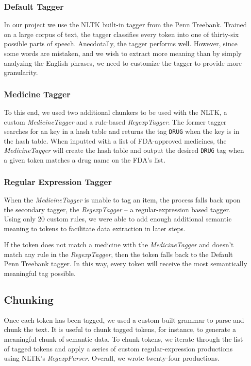 \documentclass{acm_proc_article-sp}
\begin{document}
\subsubsection{Default Tagger}
In our project we use the NLTK built-in tagger from the Penn Treebank\cite{treebank}. Trained on a
large corpus of text, the tagger classifies every token into one of thirty-six possible parts of speech. 
Anecdotally, the tagger performs well. However, since some words are mistaken, and we wish to extract 
more meaning than by simply analyzing the English phrases, we need to customize the tagger to provide more
granularity.

\subsubsection{Medicine Tagger}
To this end, we used two additional chunkers to be used with the NLTK, a custom \textit{MedicineTagger} and
a rule-based \textit{RegexpTagger}. The former tagger searches for an key in a hash table and returns the tag
\texttt{DRUG} when the key is in the hash table. When inputted with a list of FDA-approved medicines, the
\textit{MedicineTagger} will create the hash table and output the desired \texttt{DRUG} tag when a given token
matches a drug name on the FDA's list.

\subsubsection{Regular Expression Tagger}
When the \textit{MedicineTagger} is unable to tag an item, the process falls back upon the secondary tagger, the
\textit{RegexpTagger} -- a regular-expression based tagger. Using only 20 custom rules, we were able to add enough
additional semantic meaning to tokens to facilitate data extraction in later steps.

If the token does not match a medicine with the \textit{MedicineTagger} and doesn't match any rule in the
\textit{RegexpTagger}, then the token falls back to the Default Penn Treebank tagger. In this way, every token will
receive the most semantically meaningful tag possible.

\subsection{Chunking}
Once each token has been tagged, we used a custom-built grammar to parse and chunk
the text. It is useful to chunk tagged tokens, for instance, to generate a meaningful chunk of
semantic data. To chunk tokens, we iterate through the list of tagged tokens and apply a series
of custom regular-expression productions using NLTK's \textit{RegexpParser}. Overall, we wrote
twenty-four productions.
\end{document}

